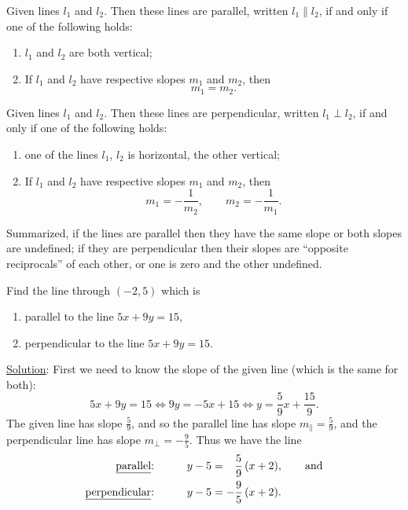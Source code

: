 \begin{theorem} Given lines $l_1$ and $l_2$.  
Then these lines are parallel, written $l_1\parallel l_2$,
if and only if one of the following holds:
\begin{enumerate}
\item $l_1$ and $l_2$ are both vertical;
\item If $l_1$ and $l_2$ have respective slopes $m_1$ and $m_2$, 
then $$m_1=m_2.$$
\end{enumerate}
\end{theorem}

\begin{theorem} Given lines $l_1$ and $l_2$.  
Then these lines are perpendicular, written $l_1\perp l_2$,
if and only if one of the following holds:
\begin{enumerate}
\item one of the lines $l_1$, $l_2$ is horizontal, the other vertical;
\item If $l_1$ and $l_2$ have respective slopes $m_1$ and $m_2$, 
then $$m_1=-\frac{1}{m_2}, \qquad m_2=-\frac{1}{m_1}.$$
\end{enumerate}
\end{theorem}
Summarized, if the lines are parallel then they have the same
slope or both slopes are undefined;  if they are perpendicular
then their slopes are ``opposite reciprocals'' of each other, or
one is zero and the other undefined.

\bex
Find the line through $(-2,5)$ which is
\begin{enumerate}
\item parallel to the line $5x+9y=15$,
\item perpendicular to the line $5x+9y=15$.
\end{enumerate}

\underline{Solution}: First we need to know the slope of the
given line (which is the same for both):
$$5x+9y=15\iff 9y=-5x+15\iff y=\frac59x+\frac{15}9.$$
The given line has slope $\frac59$, and so the
parallel line has slope $m_\parallel=\frac59$, and the
perpendicular line has slope $m_\perp=-\frac95$.
Thus we have the line
\begin{alignat*}{2}
\text{\underline{parallel}:}&\qquad& y-5&=\hphantom{-}\frac59\,(x+2),
	\qquad\text{and}\\
\text{\underline{perpendicular}:}&& y-5&=-\frac95\,(x+2).
\end{alignat*}
\eex

